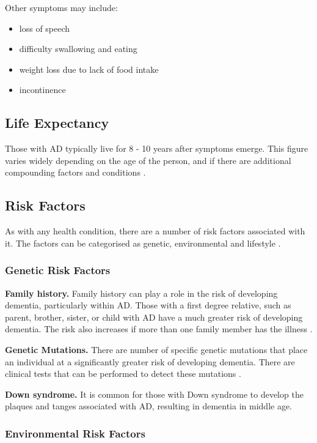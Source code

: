 Other symptoms may include:
\begin{itemize}[noitemsep,topsep=0pt]
\item loss of speech
\item difficulty swallowing and eating
\item weight loss due to lack of food intake
\item incontinence
\end{itemize}

\subsection{Life Expectancy}
Those with AD typically live for 8 - 10 years after symptoms emerge. This figure varies widely depending on the age of the person, and if there are additional compounding factors and conditions \cite{Grout2015}.

\subsection{Risk Factors}
As with any health condition, there are a number of risk factors associated with it. The factors can be categorised as genetic, environmental and lifestyle \cite{Deckers2015, Norton2015-TRCI}.

\subsubsection{Genetic Risk Factors}
\textbf{Family history.}
Family history can play a role in the risk of developing dementia, particularly within AD. Those with a first degree relative, such as parent, brother, sister, or child with AD have a much greater risk of developing dementia. The risk also increases if more than one family member has the illness \cite{AlzheimersAssociation2015b}.

\textbf{Genetic Mutations.}
There are number of specific genetic mutations that place an individual at a significantly greater risk of developing dementia. There are clinical tests that can be performed to detect these mutations \cite{MayoFoundationforMedicalEducationandResearch2015a}.

\textbf{Down syndrome.}
It is common for those with Down syndrome to develop the plaques and tanges associated with AD, resulting in dementia in middle age.

\subsubsection{Environmental Risk Factors}

